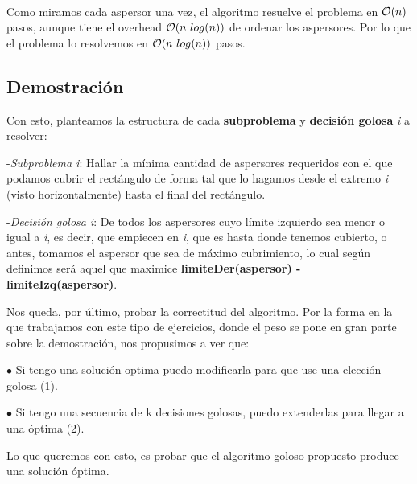 \documentclass[./main.tex]{subfiles}
\begin{document}
\paragraph{} Como miramos cada aspersor una vez, el algoritmo resuelve el problema en \(\mathcal{O}(n)\) pasos, aunque tiene el overhead \(\mathcal{O}(n\ log(n))\) de ordenar los aspersores. Por lo que el problema lo resolvemos en \(\mathcal{O}(n\ log(n))\) pasos. %

\subsection{Demostración}
\label{sec:ej2-dem}


Con esto, planteamos la estructura de cada \textbf{subproblema} y \textbf{decisión golosa} \textit{i} a resolver: \newline

-\textit{Subproblema i}: Hallar la mínima cantidad de aspersores requeridos con el que podamos cubrir el  rectángulo de forma tal que lo hagamos desde el extremo \textit{i} (visto horizontalmente) hasta el final del rectángulo.\newline

-\textit{Decisión golosa i}: De todos los aspersores cuyo límite izquierdo sea menor o igual a \textit{i}, es decir, que empiecen en \textit{i}, que es hasta donde tenemos cubierto, o antes, tomamos el aspersor que sea de máximo cubrimiento, lo cual según definimos será aquel que maximice \textbf{limiteDer(aspersor) - limiteIzq(aspersor)}. \newline

Nos queda, por último, probar la correctitud del algoritmo. Por la forma en la que trabajamos con este tipo de ejercicios, donde el peso se pone en gran parte sobre la demostración, nos propusimos a ver que: \newline

$\bullet$ Si tengo una solución optima puedo modificarla para que use una elección golosa (1). \newline

$\bullet$ Si tengo una secuencia de k decisiones golosas, puedo extenderlas para llegar a una óptima (2).\newline

Lo que queremos con esto, es probar que el algoritmo goloso propuesto produce una solución óptima. \newline \newline 
\end{document}
